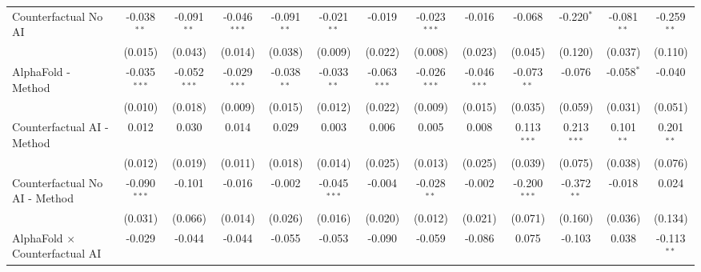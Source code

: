 \begin{tabular}{lcccccccccccc}
   Counterfactual No AI                                       & -0.038$^{**}$  & -0.091$^{**}$  & -0.046$^{***}$ & -0.091$^{**}$ & -0.021$^{**}$  & -0.019         & -0.023$^{***}$ & -0.016         & -0.068         & -0.220$^{*}$  & -0.081$^{**}$ & -0.259$^{**}$\\   
                                                              & (0.015)        & (0.043)        & (0.014)        & (0.038)       & (0.009)        & (0.022)        & (0.008)        & (0.023)        & (0.045)        & (0.120)       & (0.037)       & (0.110)\\   
   AlphaFold - Method                                         & -0.035$^{***}$ & -0.052$^{***}$ & -0.029$^{***}$ & -0.038$^{**}$ & -0.033$^{**}$  & -0.063$^{***}$ & -0.026$^{***}$ & -0.046$^{***}$ & -0.073$^{**}$  & -0.076        & -0.058$^{*}$  & -0.040\\   
                                                              & (0.010)        & (0.018)        & (0.009)        & (0.015)       & (0.012)        & (0.022)        & (0.009)        & (0.015)        & (0.035)        & (0.059)       & (0.031)       & (0.051)\\   
   Counterfactual AI - Method                                 & 0.012          & 0.030          & 0.014          & 0.029         & 0.003          & 0.006          & 0.005          & 0.008          & 0.113$^{***}$  & 0.213$^{***}$ & 0.101$^{**}$  & 0.201$^{**}$\\   
                                                              & (0.012)        & (0.019)        & (0.011)        & (0.018)       & (0.014)        & (0.025)        & (0.013)        & (0.025)        & (0.039)        & (0.075)       & (0.038)       & (0.076)\\   
   Counterfactual No AI - Method                              & -0.090$^{***}$ & -0.101         & -0.016         & -0.002        & -0.045$^{***}$ & -0.004         & -0.028$^{**}$  & -0.002         & -0.200$^{***}$ & -0.372$^{**}$ & -0.018        & 0.024\\   
                                                              & (0.031)        & (0.066)        & (0.014)        & (0.026)       & (0.016)        & (0.020)        & (0.012)        & (0.021)        & (0.071)        & (0.160)       & (0.036)       & (0.134)\\   
   AlphaFold $\times$ Counterfactual AI                       & -0.029         & -0.044         & -0.044         & -0.055        & -0.053         & -0.090         & -0.059         & -0.086         & 0.075          & -0.103        & 0.038         & -0.113$^{**}$\\   

\end{tabular}
